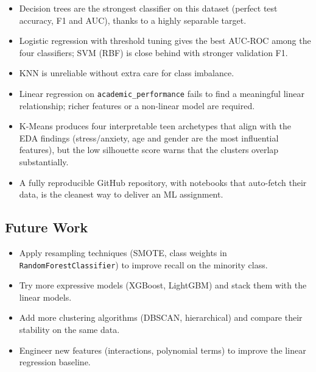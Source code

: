 \documentclass[11pt,a4paper]{article}
\begin{document}
\begin{itemize}[leftmargin=*, itemsep=2pt]
    \item Decision trees are the strongest classifier on this dataset
        (perfect test accuracy, F1 and AUC), thanks to a highly
        separable target.
    \item Logistic regression with threshold tuning gives the best
        AUC-ROC among the four classifiers; SVM (RBF) is close behind
        with stronger validation F1.
    \item KNN is unreliable without extra care for class imbalance.
    \item Linear regression on \texttt{academic\_performance} fails to
        find a meaningful linear relationship; richer features or a
        non-linear model are required.
    \item K-Means produces four interpretable teen archetypes that align
        with the EDA findings (stress/anxiety, age and gender are the
        most influential features), but the low silhouette score warns
        that the clusters overlap substantially.
    \item A fully reproducible GitHub repository, with notebooks that
        auto-fetch their data, is the cleanest way to deliver an ML
        assignment.
\end{itemize}

\subsection*{Future Work}
\begin{itemize}[leftmargin=*, itemsep=2pt]
    \item Apply resampling techniques (SMOTE, class weights in
        \texttt{RandomForestClassifier}) to improve recall on the
        minority class.
    \item Try more expressive models (XGBoost, LightGBM) and stack them
        with the linear models.
    \item Add more clustering algorithms (DBSCAN, hierarchical) and
        compare their stability on the same data.
    \item Engineer new features (interactions, polynomial terms) to
        improve the linear regression baseline.
\end{itemize}

\newpage
\end{document}
